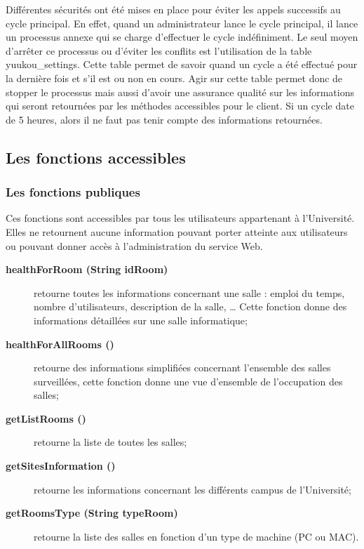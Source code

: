 Diff\'erentes s\'ecurit\'es ont \'et\'e mises en place pour \'eviter les appels successifs au cycle principal.
En effet, quand un administrateur lance le cycle principal, il lance un processus annexe qui se charge d'effectuer le cycle ind\'efiniment.
Le seul moyen d'arr\^eter ce processus ou d'\'eviter les conflits est l'utilisation de la table \textsf{yuukou\_settings}.
Cette table permet de savoir quand un cycle a \'et\'e effectu\'e pour la derni\`ere fois et s'il est ou non en cours.
Agir sur cette table permet donc de stopper le processus mais aussi d'avoir une assurance qualit\'e sur les informations qui seront retourn\'ees par les m\'ethodes accessibles pour le client.
Si un cycle date de 5 heures, alors il ne faut pas tenir compte des informations retourn\'ees.


\subsection{Les fonctions accessibles}

\subsubsection{Les fonctions publiques}
\label{section:fonctionsPubliques}

Ces fonctions sont accessibles par tous les utilisateurs appartenant \`a l'Universit\'e.
Elles ne retournent aucune information pouvant porter atteinte aux utilisateurs ou pouvant donner acc\`es \`a l'administration du service Web.

\begin{description}
	\item[\textbf{healthForRoom (String idRoom)}] retourne toutes les informations concernant une salle : emploi du temps, nombre d'utilisateurs, description de la salle, {\ldots} Cette fonction donne des informations d\'etaill\'ees sur une salle informatique;
	\item[\textbf{healthForAllRooms ()}] retourne des informations simplifi\'ees concernant l'ensemble des salles surveill\'ees, cette fonction donne une vue d'ensemble de l'occupation des salles;
	\item[\textbf{getListRooms ()}] retourne la liste de toutes les salles;
	\item[\textbf{getSitesInformation ()}] retourne les informations concernant les diff\'erents campus de l'Universit\'e;
	\item[\textbf{getRoomsType (String typeRoom)}] retourne la liste des salles en fonction d'un type de machine (PC ou MAC).

\end{description}

